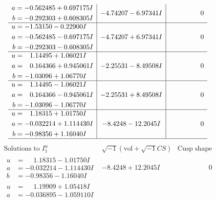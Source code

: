 \documentclass[1p]{elsarticle_modified}
\theoremstyle{definition}
\newcommand{\I}{\sqrt{-1}}
\begin{document}
$$\begin{array}{c|c|c}
\begin{aligned}
a &= -0.562485 + 0.697175 I \\
b &= -0.292303 + 0.608305 I\end{aligned}
 & -4.74207 - 6.97341 I & \phantom{-0.000000 } 0 \\ \hline\begin{aligned}
u &= -1.53150 - 0.22900 I \\
a &= -0.562485 - 0.697175 I \\
b &= -0.292303 - 0.608305 I\end{aligned}
 & -4.74207 + 6.97341 I & \phantom{-0.000000 } 0 \\ \hline\begin{aligned}
u &= \phantom{-}1.14495 + 1.06021 I \\
a &= \phantom{-}0.164366 + 0.945061 I \\
b &= -1.03096 + 1.06770 I\end{aligned}
 & -2.25531 - 8.49508 I & \phantom{-0.000000 } 0 \\ \hline\begin{aligned}
u &= \phantom{-}1.14495 - 1.06021 I \\
a &= \phantom{-}0.164366 - 0.945061 I \\
b &= -1.03096 - 1.06770 I\end{aligned}
 & -2.25531 + 8.49508 I & \phantom{-0.000000 } 0 \\ \hline\begin{aligned}
u &= \phantom{-}1.18315 + 1.01750 I \\
a &= -0.032214 + 1.114430 I \\
b &= -0.98356 + 1.16040 I\end{aligned}
 & -8.4248 - 12.2045 I & \phantom{-0.000000 } 0\\
 \hline 
 \end{array}$$\newpage$$\begin{array}{c|c|c}  
\text{Solutions to }I^u_{1}& \I (\text{vol} + \sqrt{-1}CS) & \text{Cusp shape}\\
 \hline 
\begin{aligned}
u &= \phantom{-}1.18315 - 1.01750 I \\
a &= -0.032214 - 1.114430 I \\
b &= -0.98356 - 1.16040 I\end{aligned}
 & -8.4248 + 12.2045 I & \phantom{-0.000000 } 0 \\ \hline\begin{aligned}
u &= \phantom{-}1.19909 + 1.05418 I \\
a &= -0.036895 - 1.059110 I \\

\end{aligned}
\end{array}$$
\end{document}
